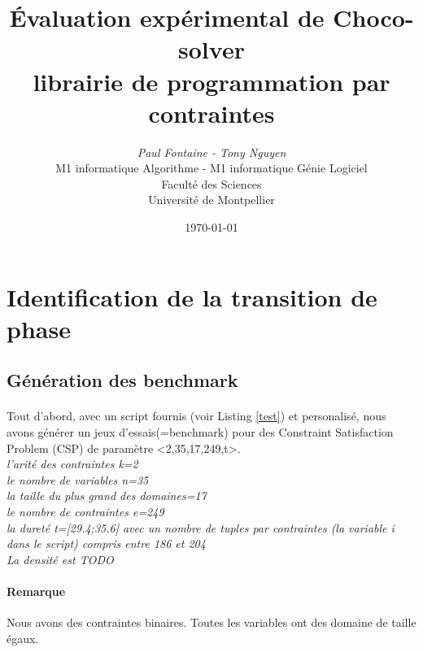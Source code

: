 \documentclass[a4paper]{article}
\begin{document}
	\title{Évaluation expérimental de Choco-solver\\librairie de programmation par contraintes}
	\author{\emph{Paul Fontaine - Tony Nguyen}\\
  M1 informatique Algorithme - M1 informatique Génie Logiciel\\
	Faculté des Sciences\\
	Université de Montpellier}
	\date{\today}
	\maketitle
	\thispagestyle{empty}
	\newpage
	\thispagestyle{empty}
	\tableofcontents
	\newpage
	\newpage
  \section{Identification de la transition de phase} 
  \subsection{Génération des benchmark}
  \paragraph{}
    Tout d'abord, avec un script fournis (voir Listing \ref{test}) et personalisé, nous avons générer un jeux d'essais(=benchmark) pour des Constraint Satisfaction Problem (CSP) de paramètre <2,35,17,249,t>.\\
    \emph{l'arité des contraintes k=2\\
    le nombre de variables n=35\\
    la taille du plus grand des domaines=17\\
    le nombre de contraintes e=249\\
    la dureté t=[29.4;35.6] avec un nombre de tuples par contraintes (la variable i dans le script) compris entre 186 et 204\\
    La densité est TODO}
  
  \paragraph{Remarque}
    Nous avons des contraintes binaires. Toutes les variables ont des domaine de taille égaux.
\end{document}
